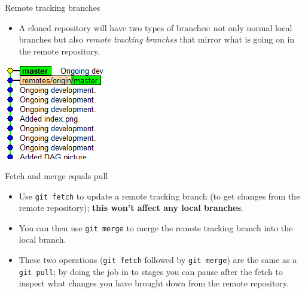 \documentclass[usenames,dvipsnames]{beamer}
\newcommand{\code}[1]{\colorbox{light-gray}{\texttt{#1}}}
\begin{document}
\begin{frame}{Remote tracking branches}
  \begin{block}{}
    \begin{itemize}
      \item{A cloned repository will have two types of branches: not only normal local branches but also \textit{remote tracking branches} that mirror what is going on in the remote repository.}
    \end{itemize}
  \end{block}
  \begin{block}{}
    \begin{center}
      \includegraphics[scale=0.8]{RemoteTrackingBranch.png}
    \end{center}
  \end{block}
\end{frame}

\begin{frame}{Fetch and merge equals pull}
  \begin{block}{}
    \begin{itemize}
      \item{Use \code{git fetch} to update a remote tracking branch (to get changes from the remote repository); \textbf{this won't affect any local branches}.}
      \item{You can then use \code{git merge} to merge the remote tracking branch into the local branch.}
      \item{These two operations (\code{git fetch} followed by \code{git merge}) are the same as a \code{git pull}; by doing the job in to stages you can pause after the fetch to inspect what changes you have brought down from the remote repository.}
    \end{itemize}
  \end{block}
\end{frame}
\end{document}
